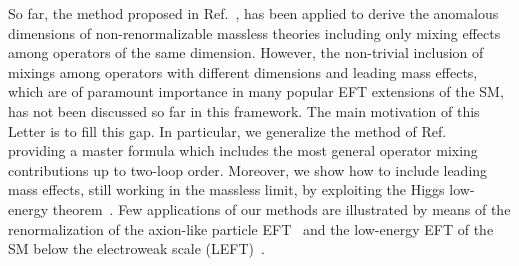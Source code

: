 \documentclass[prl,twocolumn,twoside,preprintnumbers,superscriptaddress, nofootinbib]{revtex4-2}
\begin{document}
So far, the method proposed in Ref.~\cite{Caron-Huot:2016cwu}, 
has been applied to derive the anomalous dimensions 
of non-renormalizable massless theories including only
mixing effects among operators of the same dimension. 
However, the non-trivial inclusion of mixings among operators 
with different dimensions and leading mass effects, which are 
of paramount importance in many popular EFT extensions of the SM, has not been discussed so far in this framework. The main motivation of this Letter is to fill this gap. In particular, we generalize the method of Ref.~\cite{Caron-Huot:2016cwu} providing a master formula 
which includes the most general operator mixing contributions up 
to two-loop order. Moreover, we show how to include leading 
mass effects, still working in the massless limit, by exploiting 
the Higgs low-energy theorem~\cite{Ellis:1975ap,Shifman:1979eb}. 
Few applications of our methods are illustrated by means of the renormalization of the axion-like particle EFT~\cite{Georgi:1986df,Marciano:2016yhf,DiLuzio:2020oah} 
and the low-energy EFT of the SM below 
the electroweak scale (LEFT)~\cite{Jenkins:2017dyc}.
\\
\end{document}
